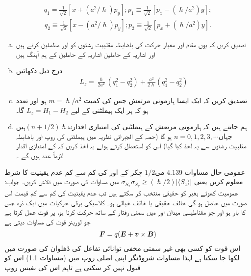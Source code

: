 \begin{align*}
    q_1=\frac{1}{\sqrt{2}}[x+(a^2/\hslash)p_y] ; p_1\equiv\frac{1}{\sqrt{2}}[p_x-(\hslash/a^2)y];
\end{align*}
\begin{align*}
    q_2\equiv\frac{1}{\sqrt{2}}[x-(a^2/\hslash)p_y];p_2\equiv\frac{1}{\sqrt{2}}[p_x+(\hslash/a^2)y].
\end{align*}
\begin{enumerate}[a.]
\item
  تصدیق کریں کہ  یوں مقام اور معیار حرکت کی باضابطہ مقلبیت  رشتوں کو   اور   مطمئین کرتے ہیں اور اشاریہ   کے حاملین اشاریہ  کے حاملین کے ہم آہنگ ہیں 
\item
  درج ذیل دکھائیں 
\begin{align*}
    L_z=\frac{\hslash}{2a^2}(q_1^2-q_2^2)+\frac{a^2}{2\hslash}(q_1^2-q_2^2)
\end{align*}
\item
 تصدیق کریں کہ ایک ایسا ہارمونی مرتعش جس کی کمیت  
\(m=\hslash/a^2\) 
ہو اور تعدد   ہو کہ ہر ایک ہیملٹنی  کے لیے \(L_z=H_1-H_2\) گا۔ 
\item
 ہم جانتے ہیں کہ ہارمونی مرتعش کے ہیملٹنی کی   امتیازی اقدار\((n+1/2)\hslash\omega\)ہیں جہاں\(n=0,1,2,3,\cdots\) ہو گا
  (حصہ   کے الجبرائی نظریہ میں ہیملٹنی کی روپ اور
 باضابطہ  مقلبیت رشتوں سے یہ اخذ کیا گیا) اس کو استعمال کرتے ہوئے یہ اخذ کریں کہ  کے امتیازی اقدار لازماً عدد ہوں گے ۔
\end{enumerate}
عمومی حال مساوات 4.139 می\(1/2\) چکر کے  اور  کی کم سے کم عدم یقینیت کا شرط معلوم کریں یعنی \(\sigma_{S_{x}}\sigma_{S_{y}}\geq(\hslash/2)|\langle S_z\rangle|\) میں مساوات کی صورت میں تلاش کریں۔ جواب: عمومیت کھوئے بغیر  کو حقیقی منتخب کر سکتے ہیں تب عدم یقینیت کی کم سے کم قیمت اس صورت میں حاصل ہو گی  خالف حقیقی یا خالف خیالی ہو۔
کلاسیکی برقی حرکیات میں ایک ذرہ جس کا بار   ہو اور جو مقناطیسی میدان  اور   میں سمتی رفتار   کے ساتھ حرکت کرتا ہو، پر قوت عمل کرتا ہے جو لورینز قوت کی مساوات دیتی ہے \begin{align}
    {\ensuremath{{\boldsymbol{F}}}}=q({{\boldsymbol{E}}}+{{\boldsymbol{v}}}\times{\ensuremath{{\boldsymbol{B}}}})
\end{align}
اس قوت کو کسی بھی غیر سمتی مخفی توانائی تفاعل کی ڈھلوان کی صورت میں لکھا جا سکتا ہے لہٰذا مساوات شروڈنگر اپنی اصلی روپ میں (مساوات 1.1) اس کو قبول نہیں کر سکتی ہے تاہم اس کی نفیس روپ 
